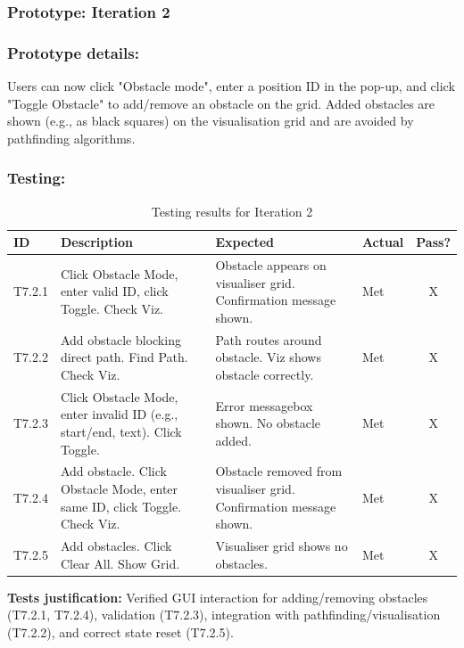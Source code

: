 \subsubsection*{Prototype: Iteration 2}




\subsubsection{Prototype details:}
Users can now click "Obstacle mode", enter a position ID in the pop-up, and click "Toggle Obstacle" to add/remove an obstacle on the grid. Added obstacles are shown (e.g., as black squares) on the visualisation grid and are avoided by pathfinding algorithms.

\subsubsection{Testing:} %
\begin{table}[htbp]
	\centering
	\begin{tabularx}{\textwidth}{|l|X|p{4.5cm}|p{1.5cm}|c|}
		\hline
		\textbf{ID} & \textbf{Description} & \textbf{Expected} & \textbf{Actual} & \textbf{Pass?} \\
		\hline
		T7.2.1 & Click Obstacle Mode, enter valid ID, click Toggle. Check Viz. & Obstacle appears on visualiser grid. Confirmation message shown. & Met & X \\
		\hline
		T7.2.2 & Add obstacle blocking direct path. Find Path. Check Viz. & Path routes around obstacle. Viz shows obstacle correctly. & Met & X \\
		\hline
		T7.2.3 & Click Obstacle Mode, enter invalid ID (e.g., start/end, text). Click Toggle. & Error messagebox shown. No obstacle added. & Met & X \\
		\hline
		T7.2.4 & Add obstacle. Click Obstacle Mode, enter same ID, click Toggle. Check Viz. & Obstacle removed from visualiser grid. Confirmation message shown. & Met & X \\
        \hline
        T7.2.5 & Add obstacles. Click Clear All. Show Grid. & Visualiser grid shows no obstacles. & Met & X \\
		\hline
	\end{tabularx}
	\caption{Testing results for Iteration 2}
\end{table}
\textbf{Tests justification:} Verified GUI interaction for adding/removing obstacles (T7.2.1, T7.2.4), validation (T7.2.3), integration with pathfinding/visualisation (T7.2.2), and correct state reset (T7.2.5).

